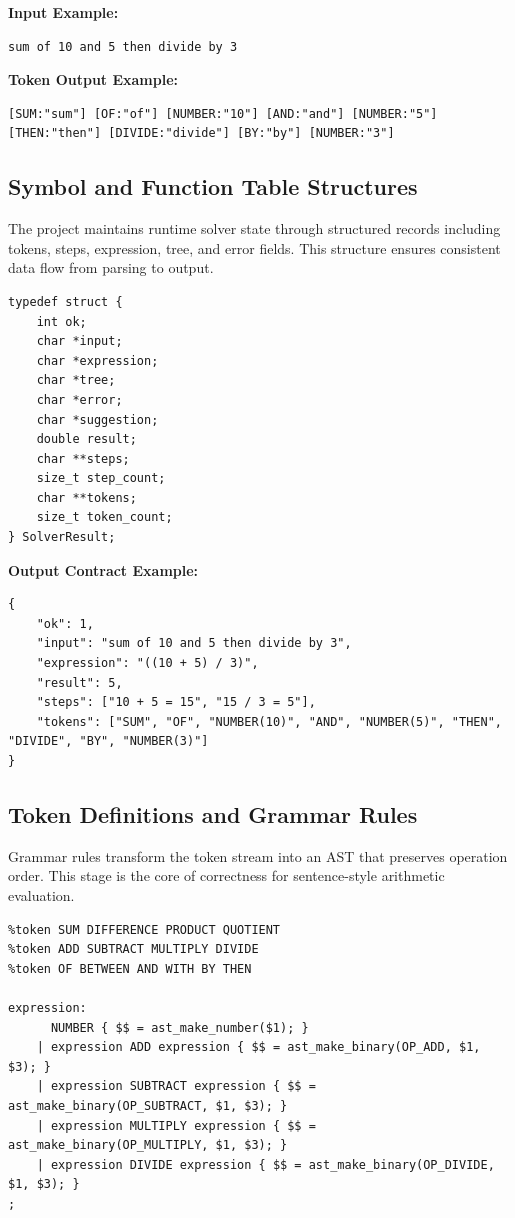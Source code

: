 \documentclass[12pt,a4paper]{report}
\begin{document}
\textbf{Input Example:}
\begin{lstlisting}[style=ccode,caption={Raw user sentence input}]
sum of 10 and 5 then divide by 3
\end{lstlisting}

\textbf{Token Output Example:}
\begin{lstlisting}[style=ccode,caption={Illustrative token stream emitted by lexer}]
[SUM:"sum"] [OF:"of"] [NUMBER:"10"] [AND:"and"] [NUMBER:"5"]
[THEN:"then"] [DIVIDE:"divide"] [BY:"by"] [NUMBER:"3"]
\end{lstlisting}

\subsection{Symbol and Function Table Structures}

The project maintains runtime solver state through structured records including tokens,
steps, expression, tree, and error fields. This structure ensures consistent data flow from parsing to output.

\begin{lstlisting}[style=ccode,caption={Solver result contract from src/solver.h}]
typedef struct {
    int ok;
    char *input;
    char *expression;
    char *tree;
    char *error;
    char *suggestion;
    double result;
    char **steps;
    size_t step_count;
    char **tokens;
    size_t token_count;
} SolverResult;
\end{lstlisting}

\textbf{Output Contract Example:}
\begin{lstlisting}[style=ccode,caption={Sample JSON response stored in history}]
{
    "ok": 1,
    "input": "sum of 10 and 5 then divide by 3",
    "expression": "((10 + 5) / 3)",
    "result": 5,
    "steps": ["10 + 5 = 15", "15 / 3 = 5"],
    "tokens": ["SUM", "OF", "NUMBER(10)", "AND", "NUMBER(5)", "THEN", "DIVIDE", "BY", "NUMBER(3)"]
}
\end{lstlisting}

\subsection{Token Definitions and Grammar Rules}

Grammar rules transform the token stream into an AST that preserves operation order.
This stage is the core of correctness for sentence-style arithmetic evaluation.

\begin{lstlisting}[style=ccode,caption={Grammar excerpt from src/parser.y}]
%token <number> NUMBER
%token SUM DIFFERENCE PRODUCT QUOTIENT
%token ADD SUBTRACT MULTIPLY DIVIDE
%token OF BETWEEN AND WITH BY THEN

expression:
      NUMBER { $$ = ast_make_number($1); }
    | expression ADD expression { $$ = ast_make_binary(OP_ADD, $1, $3); }
    | expression SUBTRACT expression { $$ = ast_make_binary(OP_SUBTRACT, $1, $3); }
    | expression MULTIPLY expression { $$ = ast_make_binary(OP_MULTIPLY, $1, $3); }
    | expression DIVIDE expression { $$ = ast_make_binary(OP_DIVIDE, $1, $3); }
;
\end{lstlisting}
\end{document}

